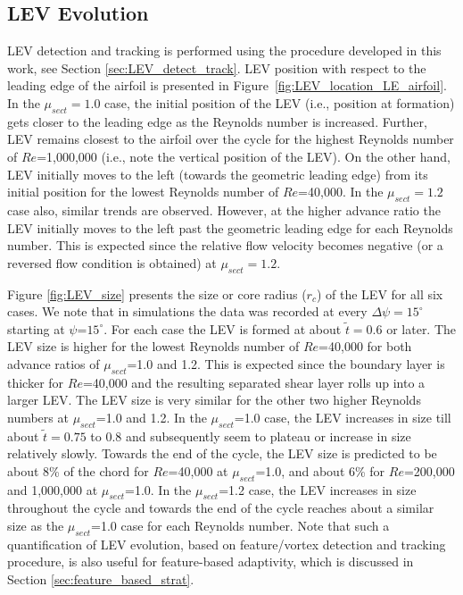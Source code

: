 \subsection{LEV Evolution}
\label{sec:LEV}


LEV detection and tracking is performed using the procedure developed in this work, see Section \ref{sec:LEV_detect_track}. LEV position with respect to the leading edge of the airfoil is presented in Figure~\ref{fig:LEV_location_LE_airfoil}.
In the $\mu_{sect}=1.0$ case, the initial position of the LEV (i.e., position at formation) gets closer to the leading edge as the Reynolds number is increased.
Further, LEV remains closest to the airfoil over the cycle for the highest Reynolds number of $Re$=1,000,000 (i.e., note the vertical position of the LEV).
On the other hand, LEV initially moves to the left (towards the geometric leading edge) from its initial position for the lowest Reynolds number of $Re$=40,000.
In the $\mu_{sect}=1.2$ case also, similar trends are observed.
However, at the higher advance ratio the LEV initially moves to the left past the geometric leading edge for each Reynolds number.
This is expected since the relative flow velocity becomes negative (or a reversed flow condition is obtained) at $\mu_{sect}=1.2$.

Figure \ref{fig:LEV_size} presents the size or core radius ($r_c$) of the LEV for all six cases.
We note that in simulations the data was recorded at every $\Delta \psi = 15^\circ$ starting at $\psi$=$15^\circ$.
For each case the LEV is formed at about $\tilde{t}=0.6$ or later.
The LEV size is higher for the lowest Reynolds number of $Re$=40,000 for both advance ratios of $\mu_{sect}$=1.0 and 1.2.
This is expected since the boundary layer is thicker for $Re$=40,000 and the resulting separated shear layer rolls up into a larger LEV.
The LEV size is very similar for the other two higher Reynolds numbers at $\mu_{sect}$=1.0 and 1.2.
In the $\mu_{sect}$=1.0 case, the LEV increases in size till about $\tilde{t}=0.75$ to 0.8 and subsequently seem to plateau or increase in size relatively slowly.
Towards the end of the cycle, the LEV size is predicted to be about 8\% of the chord for $Re$=40,000 at $\mu_{sect}$=1.0, and about 6\% for $Re$=200,000 and 1,000,000 at $\mu_{sect}$=1.0.
In the $\mu_{sect}$=1.2 case, the LEV increases in size throughout the cycle and towards the end of the cycle reaches about a similar size as the $\mu_{sect}$=1.0 case for each Reynolds number. Note that such a quantification of LEV evolution, based on feature/vortex detection and tracking procedure, is also useful for feature-based adaptivity, which is discussed in Section \ref{sec:feature_based_strat}.


